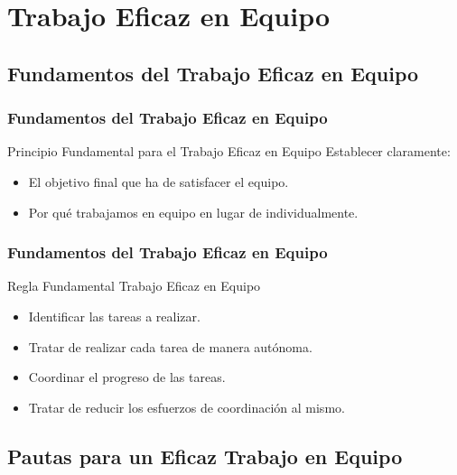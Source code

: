 \documentclass[a4paper,t,xcolor=pst,dvips]{beamer}
\begin{document}
\section{Trabajo Eficaz en Equipo}

\subsection{Fundamentos del Trabajo Eficaz en Equipo}

\begin{frame}[c]
	\frametitle{Fundamentos del Trabajo Eficaz en Equipo}
	\begin{block}{Principio Fundamental para el Trabajo Eficaz en Equipo}
		Establecer claramente:
		\begin{itemize}
			\item<2-> El objetivo final que ha de satisfacer el equipo.
			\item<3-> Por qué trabajamos en equipo en lugar de individualmente.
		\end{itemize}
	\end{block}
\end{frame}

\begin{frame}[c]
	\frametitle{Fundamentos del Trabajo Eficaz en Equipo}
	\begin{block}{Regla Fundamental Trabajo Eficaz en Equipo}
		\begin{itemize}[<+->]
			\item Identificar las tareas a realizar.
			\item Tratar de realizar cada tarea de manera autónoma.
			\item Coordinar el progreso de las tareas. 
			\item Tratar de reducir los esfuerzos de coordinación al mismo.
		\end{itemize}
	\end{block}
\end{frame}

\subsection{Pautas para un Eficaz Trabajo en Equipo}
\end{document}
